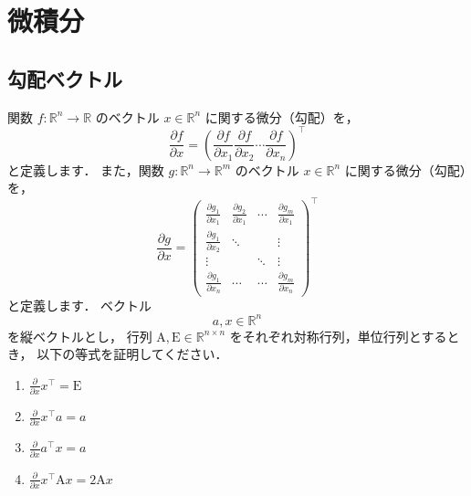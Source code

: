 \section{微積分}

\subsection{勾配ベクトル}
    関数 $f: \mathbb{R}^n \rightarrow \mathbb{R}$ のベクトル $x \in \mathbb{R}^n$ に関する微分（勾配）を，
    \begin{equation}
      \frac{\partial f}{\partial x} = \left(
        \frac{\partial f}{\partial x_1} \frac{\partial f}{\partial x_2} \cdots \frac{\partial f}{\partial x_n}
        \right)^\top
    \end{equation}
    と定義します．
    また，関数 $g: \mathbb{R}^n \rightarrow \mathbb{R}^m$ のベクトル $x \in \mathbb{R}^n$ に関する微分（勾配）を，
    \begin{equation}
      \frac{\partial g}{\partial x} = \left(
        \begin{array}{rrrr}
          \frac{\partial g_1}{\partial x_1} & \frac{\partial g_2}{\partial x_1} & \cdots & \frac{\partial g_m}{\partial x_1} \\
          \frac{\partial g_1}{\partial x_2} & \ddots & & \vdots \\
          \vdots & & \ddots & \vdots \\
          \frac{\partial g_1}{\partial x_n} & \cdots & \cdots & \frac{\partial g_m}{\partial x_n}
        \end{array}
        \right)^\top
    \end{equation}
    と定義します．
    ベクトル $$a, x \in \mathbb{R}^n$$ を縦ベクトルとし，
    行列 $\mathrm{A}, \mathrm{E} \in \mathbb{R}^{n \times n}$ をそれぞれ対称行列，単位行列とするとき，
    以下の等式を証明してください．
    \begin{enumerate}[label=(\roman*)]
      \item $\frac{\partial}{\partial x} x^\top = \mathrm{E}$
      \item $\frac{\partial}{\partial x} x^\top a = a$
      \item $\frac{\partial}{\partial x} a^\top x = a$
      \item $\frac{\partial}{\partial x} x^\top \mathrm{A} x = 2 \mathrm{A} x$
    \end{enumerate}

